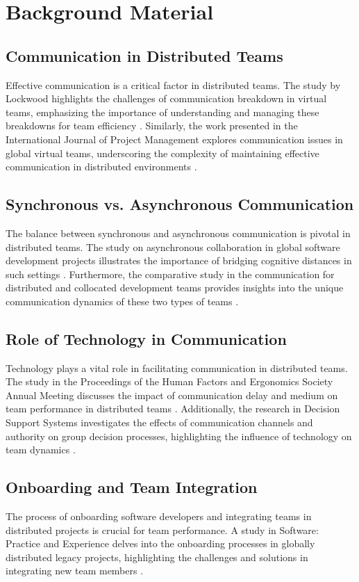 \documentclass[12pt]{article}
\begin{document}
\section{Background Material}

\subsection{Communication in Distributed Teams}
Effective communication is a critical factor in distributed teams. The study by Lockwood highlights the challenges of communication breakdown in virtual teams, emphasizing the importance of understanding and managing these breakdowns for team efficiency \cite{ref6}. Similarly, the work presented in the International Journal of Project Management explores communication issues in global virtual teams, underscoring the complexity of maintaining effective communication in distributed environments \cite{ref1}.

\subsection{Synchronous vs. Asynchronous Communication}
The balance between synchronous and asynchronous communication is pivotal in distributed teams. The study on asynchronous collaboration in global software development projects illustrates the importance of bridging cognitive distances in such settings \cite{ref3}. Furthermore, the comparative study in the communication for distributed and collocated development teams provides insights into the unique communication dynamics of these two types of teams \cite{ref4}.

\subsection{Role of Technology in Communication}
Technology plays a vital role in facilitating communication in distributed teams. The study in the Proceedings of the Human Factors and Ergonomics Society Annual Meeting discusses the impact of communication delay and medium on team performance in distributed teams \cite{ref2}. Additionally, the research in Decision Support Systems investigates the effects of communication channels and authority on group decision processes, highlighting the influence of technology on team dynamics \cite{ref5}.

\subsection{Onboarding and Team Integration}
The process of onboarding software developers and integrating teams in distributed projects is crucial for team performance. A study in Software: Practice and Experience delves into the onboarding processes in globally distributed legacy projects, highlighting the challenges and solutions in integrating new team members \cite{ref7}.
\end{document}

